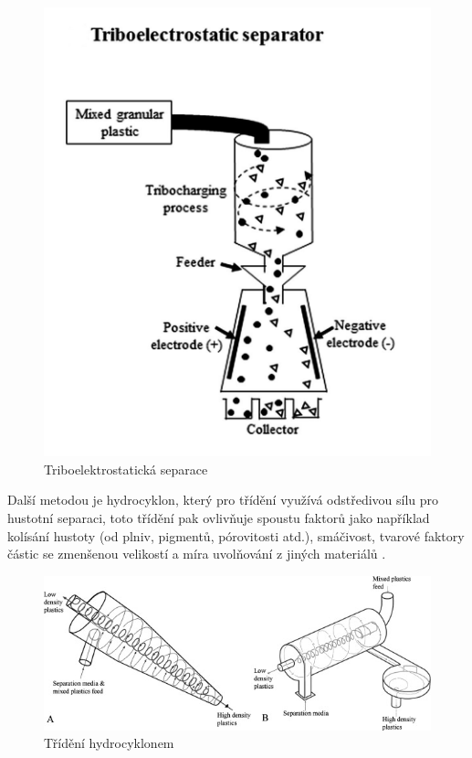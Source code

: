 \documentclass[a4paper,10pt]{article}
\theoremstyle{definition}
\begin{document}
\begin{figure}[H]
\begin{center}
\includegraphics[scale=0.23]{Images/Tribo.jpg}
\caption{Triboelektrostatická separace \cite{inproceedings}}
\label{fig:1}
\end{center}
\end{figure}

Další metodou je hydrocyklon, který pro třídění využívá odstředivou sílu pro hustotní separaci, toto třídění pak ovlivňuje spoustu faktorů jako například kolísání hustoty (od plniv, pigmentů, pórovitosti atd.), smáčivost, tvarové faktory částic se zmenšenou velikostí a míra uvolňování z jiných materiálů \cite{GUNDUPALLI201756} \cite{richard2011optimization} .\\

\begin{figure}[H]
\begin{center}
\includegraphics[scale=0.91]{Images/Hydrocyklon.jpg}
\caption{Třídění hydrocyklonem \cite{richard2011optimization}}
\label{fig:1}
\end{center}
\end{figure}
\end{document}

